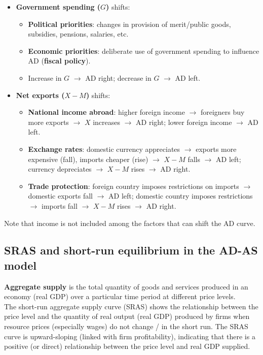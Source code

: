 \documentclass[a4paper,12pt]{article}
\newcommand{\needbold}[1]{\textcolor{red!70!black}{\textbf{#1}}}
\begin{document}
\begin{itemize}
\begin{itemize}
    \item \textbf{Legal/institutional changes}: improved access to credit, secured property rights $\to$ more investment $\to$ AD right (especially relevant in developing economies).
  \end{itemize}
  \item \textbf{Government spending ($G$)} shifts:
  \begin{itemize}
    \item \textbf{Political priorities}: changes in provision of merit/public goods, subsidies, pensions, salaries, etc.
    \item \textbf{Economic priorities}: deliberate use of government spending to influence AD (\textbf{fiscal policy}).
    \item Increase in $G$ $\to$ AD right; decrease in $G$ $\to$ AD left.
  \end{itemize}
  \item \textbf{Net exports ($X - M$)} shifts:
  \begin{itemize}
    \item \textbf{National income abroad}: higher foreign income $\to$ foreigners buy more exports $\to$ $X$ increases $\to$ AD right; lower foreign income $\to$ AD left.
    \item \textbf{Exchange rates}: domestic currency appreciates $\to$ exports more expensive (fall), imports cheaper (rise) $\to$ $X - M$ falls $\to$ AD left; currency depreciates $\to$ $X - M$ rises $\to$ AD right.
    \item \textbf{Trade protection}: foreign country imposes restrictions on imports $\to$ domestic exports fall $\to$ AD left; domestic country imposes restrictions $\to$ imports fall $\to$ $X - M$ rises $\to$ AD right.
  \end{itemize}
\end{itemize}
Note that income is not included among the factors that can shift the AD curve.
\subsection{SRAS and short-run equilibrium in the AD-AS model}
\needbold{Aggregate supply} is the total quantity of goods and services produced in an economy (real GDP) over a particular time period at different price levels.\\
The short-run aggregate supply curve (SRAS) shows the relationship between the price level and the quantity of real output (real GDP) produced by firms when resource prices (especially wages) do not change / in the short run. The SRAS curve is upward-sloping (linked with firm profitability), indicating that there is a positive (or direct) relationship between the price level and real GDP supplied.
\end{document}
